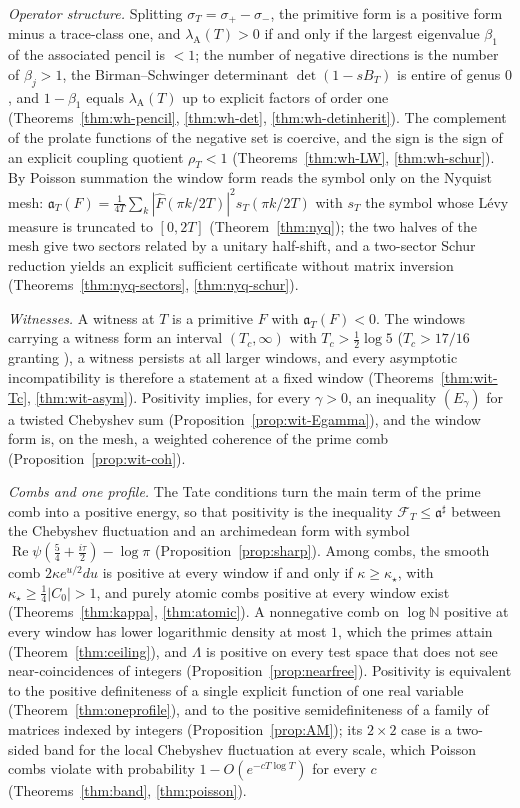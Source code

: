 \documentclass[11pt]{amsart}
\theoremstyle{definition}
\theoremstyle{remark}
\newcommand{\N}{\mathbb N}
\newcommand{\Rel}{\operatorname{Re}}
\newcommand{\lamA}{\lambda_{\mathrm A}(T)}
\newcommand{\sT}{\sigma_T}
\newcommand{\Fh}{\widehat F}
\begin{document}
\emph{Operator structure.} Splitting $\sT=\sigma_+-\sigma_-$, the primitive form is a positive form minus a
trace-class one, and $\lamA>0$ if and only if the largest eigenvalue $\beta_1$ of the associated pencil is
$<1$; the number of negative directions is the number of $\beta_j>1$, the Birman--Schwinger determinant
$\det(1-sB_T)$ is entire of genus $0$, and $1-\beta_1$ equals $\lamA$ up to explicit factors of order one
(Theorems~\ref{thm:wh-pencil}, \ref{thm:wh-det}, \ref{thm:wh-detinherit}). The complement of the prolate
functions of the negative set is coercive, and the sign is the sign of an explicit coupling quotient
$\rho_T<1$ (Theorems~\ref{thm:wh-LW}, \ref{thm:wh-schur}). By Poisson summation the window form reads the
symbol only on the Nyquist mesh: $\mathfrak a_T(F)=\frac1{4T}\sum_k|\Fh(\pi k/2T)|^2s_T(\pi k/2T)$ with $s_T$ the
symbol whose L\'evy measure is truncated to $[0,2T]$ (Theorem~\ref{thm:nyq}); the two halves of the mesh give
two sectors related by a unitary half-shift, and a two-sector Schur reduction yields an explicit sufficient
certificate without matrix inversion (Theorems~\ref{thm:nyq-sectors}, \ref{thm:nyq-schur}).

\emph{Witnesses.} A witness at $T$ is a primitive $F$ with $\mathfrak a_T(F)<0$. The windows carrying a
witness form an interval $(T_c,\infty)$ with $T_c>\frac12\log5$ ($T_c>17/16$ granting \cite{Liu2026}), a witness persists at all larger windows,
and every asymptotic incompatibility is therefore a statement at a fixed window
(Theorems~\ref{thm:wit-Tc}, \ref{thm:wit-asym}). Positivity implies, for every $\gamma>0$, an inequality
$(E_\gamma)$ for a twisted Chebyshev sum (Proposition~\ref{prop:wit-Egamma}), and the window form is, on the mesh,
a weighted coherence of the prime comb (Proposition~\ref{prop:wit-coh}).

\emph{Combs and one profile.} The Tate conditions turn the main term of the prime comb into a positive energy, so that
positivity is the inequality $\mathcal F_T\le\mathfrak a^\sharp$ between the Chebyshev fluctuation and an archimedean form with
symbol $\Rel\psi(\frac54+\frac{i\tau}2)-\log\pi$ (Proposition~\ref{prop:sharp}). Among combs, the smooth comb $2\kappa e^{u/2}du$ is
positive at every window if and only if $\kappa\ge\kappa_\star$, with $\kappa_\star\ge\frac14|C_0|>1$, and purely atomic combs positive
at every window exist (Theorems~\ref{thm:kappa}, \ref{thm:atomic}). A nonnegative comb on $\log\N$ positive at every window has
lower logarithmic density at most $1$, which the primes attain (Theorem~\ref{thm:ceiling}), and $\Lambda$ is positive on every test space that does not
see near-coincidences of integers (Proposition~\ref{prop:nearfree}). Positivity is equivalent to the positive definiteness of a single
explicit function of one real variable (Theorem~\ref{thm:oneprofile}), and to the positive semidefiniteness of a family of matrices
indexed by integers (Proposition~\ref{prop:AM}); its $2\times2$ case is a two-sided band for the local Chebyshev fluctuation at
every scale, which Poisson combs violate with probability $1-O(e^{-cT\log T})$ for every $c$ (Theorems~\ref{thm:band},
\ref{thm:poisson}).
\end{document}

